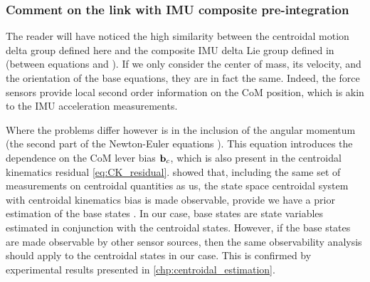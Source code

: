 \subsubsection{Comment on the link with IMU composite pre-integration}
The reader will have noticed the high similarity between the centroidal motion delta group defined here and the composite IMU delta Lie group defined 
in  (\eg between equations  and ). If we only consider the center of mass, 
its velocity, and the orientation of the base equations, they are in fact the same. 
Indeed, the force sensors provide local second order information on the CoM position, which is akin to the IMU acceleration measurements. 

Where the problems differ however is in the inclusion of the angular momentum (the second part of the Newton-Euler equations ). This equation introduces the dependence on 
the CoM lever bias ${\bf b}_c$, which is also present in the centroidal kinematics residual \eqref{eq:CK_residual}. \cite{rotella2015humanoid} showed that, including the same set of measurements on centroidal quantities as
us, the state space centroidal system with centroidal kinematics bias is made observable, provide we have a prior estimation of the base states . In our case, base states are
state variables estimated in conjunction with the centroidal states. However, if the base states are made observable by other sensor sources, then the same observability analysis
should apply to the centroidal states in our case. This is confirmed by experimental results presented in \ref{chp:centroidal_estimation}.
